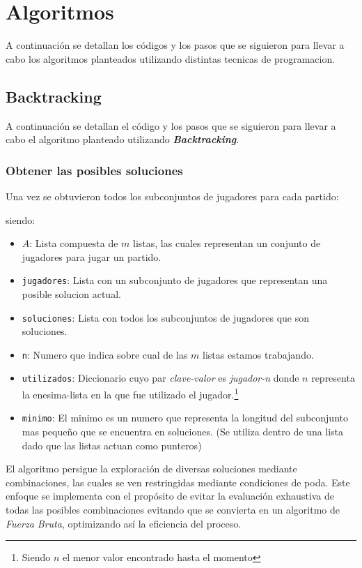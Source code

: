 \section{Algoritmos}

A continuación se detallan los códigos y los pasos que se siguieron para llevar a cabo los algoritmos planteados utilizando distintas tecnicas de programacion.

\subsection{Backtracking}

A continuación se detallan el código y los pasos que se siguieron para llevar a cabo el algoritmo planteado utilizando \textbf{\textit{Backtracking}}.

\subsubsection{Obtener las posibles soluciones}

Una vez se obtuvieron todos los subconjuntos de jugadores para cada partido:



siendo:
\begin{itemize}
    \item $A$: Lista compuesta de $m$ listas, las cuales representan un conjunto de jugadores para jugar un partido.
    \item \texttt{jugadores}: Lista con un subconjunto de jugadores que representan una posible solucion actual.
    \item \texttt{soluciones}: Lista con todos los subconjuntos de jugadores que son soluciones.
    \item \texttt{n}: Numero que indica sobre cual de las $m$ listas estamos trabajando.
    \item \texttt{utilizados}: Diccionario cuyo par \textit{clave-valor} es \textit{jugador-n} donde $n$ representa la enesima-lista en la que fue utilizado el jugador.\footnote{Siendo $n$ el menor valor encontrado hasta el momento}
    \item \texttt{minimo}: El minimo es un numero que representa la longitud del subconjunto mas pequeño que se encuentra en soluciones. (Se utiliza dentro de una lista dado que las listas actuan como punteros)
\end{itemize}

El algoritmo persigue la exploración de diversas soluciones mediante combinaciones, las cuales se ven restringidas mediante condiciones de poda. Este enfoque se implementa con el propósito de evitar la evaluación exhaustiva de todas las posibles combinaciones evitando que se convierta en un algoritmo de \textit{Fuerza Bruta}, optimizando así la eficiencia del proceso.

